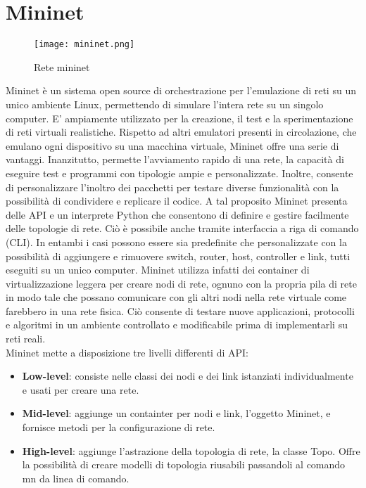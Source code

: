 \section{Mininet}
\label{ch:Mininet}
\begin{figure}[h]
    \centering
   \texttt{[image: mininet.png]}
    \caption{Rete mininet}
    \label{fig:mininet}
\end{figure}
Mininet \cite{mininet} è un sistema open source di orchestrazione per l'emulazione di reti su un unico ambiente Linux, permettendo di simulare l'intera rete su un singolo computer.
E' ampiamente utilizzato per la creazione, il test e la sperimentazione di reti virtuali realistiche.
Rispetto ad altri emulatori presenti in circolazione, che emulano ogni dispositivo su una macchina virtuale, Mininet offre una serie di vantaggi. 
Inanzitutto, permette l'avviamento rapido di una rete, la capacità di eseguire test e programmi con tipologie ampie e personalizzate. 
Inoltre, consente di personalizzare l'inoltro dei pacchetti per testare diverse funzionalità con la possibilità di condividere e replicare il codice.
A tal proposito Mininet presenta delle API e un interprete Python che consentono di definire e gestire facilmente delle topologie di rete.
Ciò è possibile anche tramite interfaccia a riga di comando (CLI). In entambi i casi possono essere sia predefinite che personalizzate con la possibilità di 
aggiungere e rimuovere switch, router, host, controller e link, tutti eseguiti su un unico computer.
Mininet utilizza infatti dei container di virtualizzazione leggera per creare nodi di rete, ognuno con la propria pila di rete in modo tale che possano comunicare con gli 
altri nodi nella rete virtuale come farebbero in una rete fisica. 
Ciò consente di testare nuove applicazioni, protocolli e algoritmi in un ambiente controllato e modificabile prima di implementarli su reti reali.
\\Mininet mette a disposizione tre livelli differenti di API:
\begin{itemize}
\item \textbf{Low-level}: consiste nelle classi dei nodi e dei link istanziati individualmente e usati per creare una rete.
\item \textbf{Mid-level}: aggiunge un containter per nodi e link, l'oggetto Mininet, e fornisce metodi per la configurazione di rete.
\item \textbf{High-level}: aggiunge l'astrazione della topologia di rete, la classe Topo. Offre la possibilità di creare modelli di topologia riusabili passandoli al comando mn da linea di comando.
\end{itemize}

